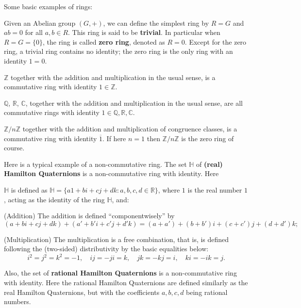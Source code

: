 \documentclass{article}
\begin{document}
\begin{Rmk_continued}{}
    Some basic examples of rings:
    \begin{compactenum}
        \item \textcolor{Df}{Given an Abelian group $(G, +)$, we can define the simplest} \textcolor{Th}{ring} \textcolor{Df}{ by $R = G$ and $ab = 0$ for all $a, b \in R$. This ring is said to be \textbf{trivial}. In particular when $R = G = \{0\}$, the ring is called \textbf{zero ring}, denoted as $R = 0$.} \textcolor{Th}{Except for the zero ring, a trivial ring contains no identity; the zero ring is the only ring with an identity $1 = 0$.}
        \item \textcolor{Th}{$\mathbb{Z}$ together with the addition and multiplication in the usual sense, is a commutative ring with identity $1\in\mathbb{Z}$.} 
        \item \textcolor{Th}{$\mathbb{Q}$, $\mathbb{R}$, $\mathbb{C}$, together with the addition and multiplication in the usual sense, are all commutative rings with identity $1\in\mathbb{Q}, \mathbb{R}, \mathbb{C}$.}
        \item \textcolor{Th}{$\mathbb{Z}/n\mathbb{Z}$ together with the addition and multiplication of congruence classes, is a commutative ring with identity $\overline{1}$. If here $n=1$ then $\mathbb{Z}/n\mathbb{Z}$ is the zero ring of course.}
        \item Here is a typical example of a non-commutative ring. \textcolor{Th}{The set $\mathbb{H}$ of \textbf{(real) Hamilton Quaternions} is a non-commutative ring with identity.} Here \textcolor{Df}{$\mathbb{H}$ is defined as $\mathbb{H} = \{a1 + bi + cj + dk: a, b, c, d \in \mathbb{R}\}$, where $1$ is the real number $1$, acting as the identity of the ring $\mathbb{H}$, and:
        \begin{compactenum}
            \item (Addition) The addition is defined ``componentwisely'' by
            $$ (a + bi + cj + dk) + (a' + b'i + c'j + d'k) = (a + a') + (b + b')i + (c + c')j + (d + d')k; $$
            \item (Multiplication) The multiplication is a free combination, that is, is defined following the (two-sided) distributivity by the basic equalities below:
            $$ i^2 = j^2 = k^2 = -1, \quad ij = -ji = k, \quad jk = -kj = i, \quad ki = -ik = j. $$
        \end{compactenum}}
        Also, \textcolor{Th}{the set of \textbf{rational Hamilton Quaternions} is a non-commutative ring with identity.} Here \textcolor{Df}{the rational Hamilton Quaternions are defined similarly as the real Hamilton Quaternions, but with the coefficients $a, b, c, d$ being rational numbers.}

\end{compactenum}
\end{Rmk_continued}
\end{document}
